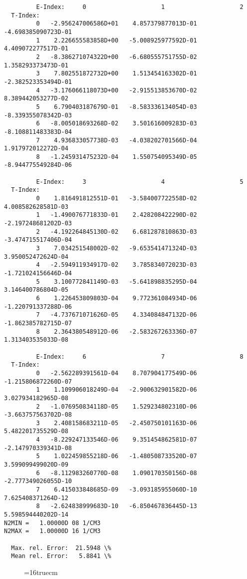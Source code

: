 \documentclass[12pt,dvipdfmx]{article}
\begin{document}
\begin{small}\begin{verbatim}
         E-Index:     0                     1                     2
  T-Index:
         0   -2.956247006586D+01    4.857379877013D-01   -4.698385090723D-01
         1    2.226655583858D+00   -5.008925977592D-01    4.409072277517D-01
         2   -8.386271074322D+00   -6.680555751755D-02    1.358293373473D-01
         3    7.802551872732D+00    1.513454163302D-01   -2.382523353494D-01
         4   -3.176066118073D+00   -2.915513853670D-02    8.389442053277D-02
         5    6.790403187679D-01   -8.583336134054D-03   -8.339355078342D-03
         6   -8.005018693268D-02    3.501616009283D-03   -8.108811483383D-04
         7    4.936833057738D-03   -4.038202701566D-04    1.917972012272D-04
         8   -1.245931475232D-04    1.550754095349D-05   -8.944775549284D-06

         E-Index:     3                     4                     5
  T-Index:
         0    1.816491812551D-01   -3.584007722558D-02    4.008582628581D-03
         1   -1.490076771833D-01    2.428208422290D-02   -2.197248681202D-03
         2   -4.192264845130D-02    6.681287810863D-03   -3.474715517406D-04
         3    7.034251548002D-02   -9.653541471324D-03    3.950052472624D-04
         4   -2.594911934917D-02    3.785834072023D-03   -1.721024156646D-04
         5    3.100772841149D-03   -5.641898835295D-04    3.146400786804D-05
         6    1.226453809803D-04    9.772361084934D-06   -1.220791337288D-06
         7   -4.737671071626D-05    4.334084847132D-06   -1.862385782715D-07
         8    2.364380548912D-06   -2.583267263336D-07    1.313403535033D-08

         E-Index:     6                     7                     8
  T-Index:
         0   -2.562289391561D-04    8.707904177549D-06   -1.215806872260D-07
         1    1.109906018249D-04   -2.900632901582D-06    3.027934182965D-08
         2   -1.076950834118D-05    1.529234802310D-06   -3.663757563702D-08
         3    2.408158683211D-05   -2.450750101163D-06    5.482201735529D-08
         4   -8.229247133546D-06    9.351454862581D-07   -2.147970339341D-08
         5    1.022459855218D-06   -1.480508733520D-07    3.599099499020D-09
         6   -8.112983260770D-08    1.090170350156D-08   -2.777349026055D-10
         7    6.415033848685D-09   -3.093185955060D-10    7.625408371264D-12
         8   -2.624838999683D-10   -6.850467836445D-13    5.598594440202D-14
N2MIN =   1.00000D 08 1/CM3
N2MAX =   1.00000D 16 1/CM3

  Max. rel. Error:  21.5948 \%
  Mean rel. Error:   5.8841 \%

\end{verbatim}\end{small}
\begin{figure} \label{2.3.13d}
\epsfxsize=16truecm
\end{figure}
\newpage
\end{document}

